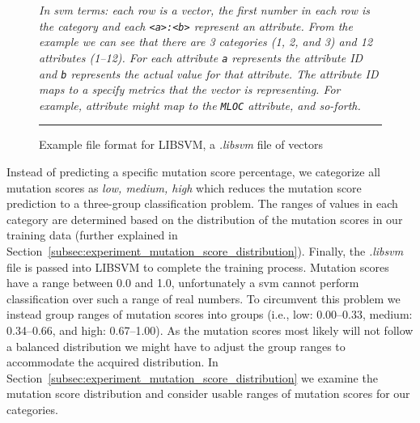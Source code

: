\begin{figure}[t]
  \centering
  \begin{minipage}{9.5cm}
    
  \end{minipage}
  \caption{Example file format for LIBSVM, a \emph{.libsvm} file of vectors}
  \vspace{1mm}
  \footnotesize{\emph{In \gls{svm} terms: each row is a vector, the first number in each row is the category and each \texttt{<a>:<b>} represent an attribute. From the example we can see that there are 3 categories (1, 2, and 3) and 12 attributes (1--12). For each attribute \texttt{a} represents the attribute ID and \texttt{b} represents the actual value for that attribute. The attribute ID maps to a specify metrics that the vector is representing. For example, attribute  might map to the \texttt{MLOC} attribute, and so-forth.}}
  \vspace{2mm}
  \hrule
  \label{fig:libsvm_file}
\end{figure}

Instead of predicting a specific mutation score percentage, we categorize all mutation scores as \textit{low, medium, high} which reduces the mutation score prediction to a three-group classification problem. The ranges of values in each category are determined based on the distribution of the mutation scores in our training data (further explained in Section~\ref{subsec:experiment_mutation_score_distribution}). Finally, the \emph{.libsvm} file is passed into LIBSVM to complete the training process. Mutation scores have a range between 0.0 and 1.0, unfortunately a \gls{svm} cannot perform classification over such a range of real numbers. To circumvent this problem we instead group ranges of mutation scores into groups (i.e., low: 0.00--0.33, medium: 0.34--0.66, and high: 0.67--1.00). As the mutation scores most likely will not follow a balanced distribution we might have to adjust the group ranges to accommodate the acquired distribution. In Section~\ref{subsec:experiment_mutation_score_distribution} we examine the mutation score distribution and consider usable ranges of mutation scores for our categories.


